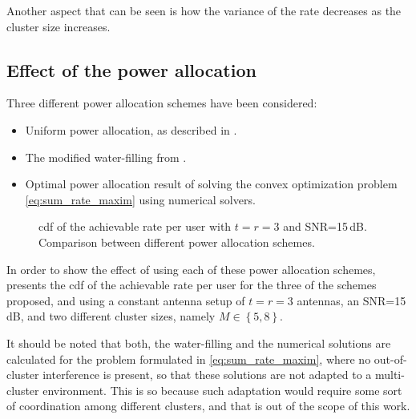 Another aspect that can be seen is how the variance of the rate decreases as the
cluster size increases.

\subsection{Effect of the power allocation}\label{ssec:stats_power_alloc}

Three different power allocation schemes have been considered:

\begin{itemize}
   \item Uniform power allocation, as described in
      .
   \item The modified water-filling from .
   \item Optimal power allocation result of solving the convex optimization
      problem \eqref{eq:sum_rate_maxim} using numerical solvers.
\end{itemize}

\begin{figure}[t]
\begin{center}
   \dummybox
\end{center}
\caption{\gls{cdf} of the achievable rate per user with $t=r=3$ and SNR=15\,dB.
Comparison between different power allocation schemes.}
\label{fig:cdf_power_alloc}
\end{figure}

In order to show the effect of using each of these power allocation schemes,
 presents the \gls{cdf} of the achievable rate per
user for the three of the schemes proposed, and using a constant antenna setup
of $t = r = 3$ antennas, an SNR=15\,dB, and two different cluster sizes, namely
$M \in \left\{5, 8\right\}$.

It should be noted that both, the water-filling and the numerical solutions are
calculated for the problem formulated in \eqref{eq:sum_rate_maxim}, where no
out-of-cluster interference is present, so that these solutions are not adapted
to a multi-cluster environment. This is so because such adaptation would require
some sort of coordination among different clusters, and that is out of the scope
of this work.

